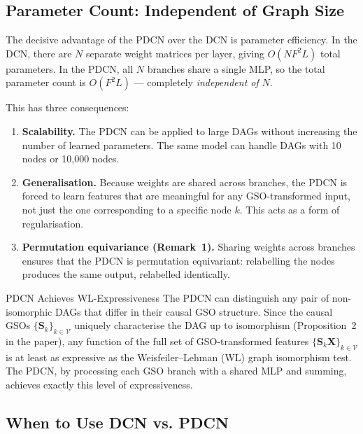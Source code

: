 \subsection{Parameter Count: Independent of Graph Size}

The decisive advantage of the PDCN over the DCN is parameter efficiency. In the
DCN, there are $N$ separate weight matrices per layer, giving $O(NF^2L)$ total
parameters. In the PDCN, all $N$ branches share a single MLP, so the total
parameter count is $O(F^2 L)$ --- completely \emph{independent of} $N$.

This has three consequences:

\begin{enumerate}
    \item \textbf{Scalability.} The PDCN can be applied to large DAGs without
          increasing the number of learned parameters. The same model can handle
          DAGs with 10 nodes or 10,000 nodes.
    \item \textbf{Generalisation.} Because weights are shared across branches,
          the PDCN is forced to learn features that are meaningful for any
          GSO-transformed input, not just the one corresponding to a specific
          node $k$. This acts as a form of regularisation.
    \item \textbf{Permutation equivariance (Remark~1).} Sharing weights across
          branches ensures that the PDCN is permutation equivariant: relabelling
          the nodes produces the same output, relabelled identically.
\end{enumerate}

\begin{keyinsight}{PDCN Achieves WL-Expressiveness}
The PDCN can distinguish any pair of non-isomorphic DAGs that differ in their
causal GSO structure. Since the causal GSOs $\{\mathbf{S}_k\}_{k \in
\mathcal{V}}$ uniquely characterise the DAG up to isomorphism (Proposition~2 in
the paper), any function of the full set of GSO-transformed features
$\{\mathbf{S}_k \mathbf{X}\}_{k \in \mathcal{V}}$ is at least as expressive as
the Weisfeiler--Lehman (WL) graph isomorphism test. The PDCN, by processing
each GSO branch with a shared MLP and summing, achieves exactly this level of
expressiveness.
\end{keyinsight}

\subsection{When to Use DCN vs. PDCN}

